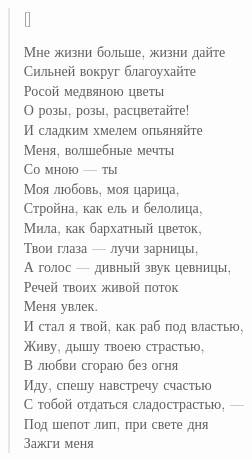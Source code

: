 \newpage
\vspace*{0cm}


\settowidth{\versewidth}{Мне жизни больше, жизни дайте\ldotse}
\begin{verse}[\versewidth]
\begin{patverse*}
Мне жизни больше, жизни дайте\ldotse\\
Сильней вокруг благоухайте\\
    Росой медвяною цветы\ldotse\\
О розы, розы, расцветайте!\\
И сладким хмелем опьяняйте\\
    Меня, волшебные мечты\ldotst\\
		Со мною --- ты\ldotst\\
Моя любовь, моя царица,\\
Стройна, как ель и белолица,\\
    Мила, как бархатный цветок,\\
Твои глаза --- лучи зарницы,\\
А голос --- дивный звук цевницы,\\
    Речей твоих живой поток\\
        Меня увлек.\\
И стал я твой, как раб под властью,\\
Живу, дышу твоею страстью,\\
    В любви сгораю без огня\ldotst\\
Иду, спешу навстречу счастью\\
С тобой отдаться сладострастью, ---\\
    Под шепот лип, при свете дня\ldotst\\
        Зажги меня\ldotst
\end{patverse*}
\end{verse}

\newpage
\vspace*{0cm}


